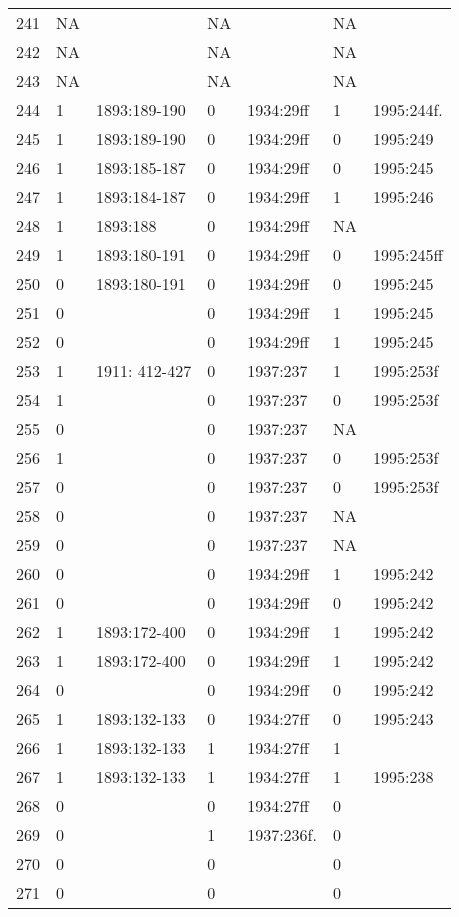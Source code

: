 {\begin{longtable}{p{.04\linewidth}p{.1\linewidth}p{.16\linewidth}p{.08\linewidth}p{.16\linewidth}p{.08\linewidth}p{.16\linewidth}}
241 & NA &  & NA &  & NA & \\
242 & NA &  & NA &  & NA & \\
243 & NA &  & NA &  & NA & \\
244 & 1 & 1893:189-190 & 0 & 1934:29ff & 1 & 1995:244f.\\
245 & 1 & 1893:189-190 & 0 & 1934:29ff & 0 & 1995:249\\
246 & 1 & 1893:185-187 & 0 & 1934:29ff & 0 & 1995:245\\
247 & 1 & 1893:184-187 & 0 & 1934:29ff & 1 & 1995:246\\
248 & 1 & 1893:188 & 0 & 1934:29ff & NA & \\
249 & 1 & 1893:180-191 & 0 & 1934:29ff & 0 & 1995:245ff\\
250 & 0 & 1893:180-191 & 0 & 1934:29ff & 0 & 1995:245\\
251 & 0 &  & 0 & 1934:29ff & 1 & 1995:245\\
252 & 0 &  & 0 & 1934:29ff & 1 & 1995:245\\
253 & 1 & 1911: 412-427 & 0 & 1937:237 & 1 & 1995:253f\\
254 & 1 &  & 0 & 1937:237 & 0 & 1995:253f\\
255 & 0 &  & 0 & 1937:237 & NA & \\
256 & 1 &  & 0 & 1937:237 & 0 & 1995:253f\\
257 & 0 &  & 0 & 1937:237 & 0 & 1995:253f\\
258 & 0 &  & 0 & 1937:237 & NA & \\
259 & 0 &  & 0 & 1937:237 & NA & \\
260 & 0 &  & 0 & 1934:29ff & 1 & 1995:242\\
261 & 0 &  & 0 & 1934:29ff & 0 & 1995:242\\
262 & 1 & 1893:172-400 & 0 & 1934:29ff & 1 & 1995:242\\
263 & 1 & 1893:172-400 & 0 & 1934:29ff & 1 & 1995:242\\
264 & 0 &  & 0 & 1934:29ff & 0 & 1995:242\\
265 & 1 & 1893:132-133 & 0 & 1934:27ff & 0 & 1995:243\\
266 & 1 & 1893:132-133 & 1 & 1934:27ff & 1 & \\
267 & 1 & 1893:132-133 & 1 & 1934:27ff & 1 & 1995:238\\
268 & 0 &  & 0 & 1934:27ff & 0 & \\
269 & 0 &  & 1 & 1937:236f. & 0 & \\
270 & 0 &  & 0 &  & 0 & \\
271 & 0 &  & 0 &  & 0 & \\

\end{longtable}}

